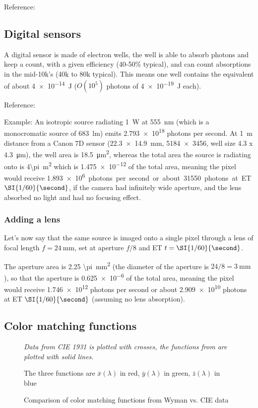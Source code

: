 Reference: 

\subsection{Digital sensors}
A digital sensor is made of electron wells, the well is able to absorb photons
and keep a count, with a given efficiency (40-50\% typical), and can count
absorptions in the mid-10k’s (40k to 80k typical).
This means one well contains the equivalent of about \SI{4e-14}{\joule}
($O(10^5)$ photons of \SI{4e-19}{\joule} each).

Reference: 

Example:
An isotropic source radiating \SI{1}{\watt} at \SI{555}{\nano\meter}
(which is a monocromatic source of \SI{683}{\lumen}) emits \num{2.793e18} photons per second.
At \SI{1}{\meter} distance from a Canon 7D sensor
(\SI{22.3 x 14.9}{\milli\meter}, \SI{5184 x 3456}{\pixel}, well size \SI{4.3 x
4.3}{\micro\meter}),
the well area is \SI{18.5}{\square\micro\meter}, whereas the total area the
source is radiating onto
is \SI{4\pi}{\square\meter} which is \num{1.475e-12} of the total area, meaning
the pixel would
receive \SI{1.893e6} photons per second or about \num{31550} photons at ET
$\SI{1/60}{\second}$, if the
camera had infinitely wide aperture, and the lens absorbed no light and had
no focusing effect.

\subsubsection{Adding a lens}
Let's now say that the same source is imaged onto a single pixel through a lens
of
focal length $f = \SI{24}{\milli\meter}$, set at aperture $f/8$ and ET $t = \SI{1/60}{\second}$.

The aperture area is \SI{2.25 \pi}{\square\milli\meter} (the diameter of the
aperture is
$24/8 = \SI{3}{\milli\meter}$), so that the aperture is \num{0.625e-6} of the
total area, meaning
the pixel would receive \num{1.746e12} photons per second or about
\num{2.909e10} photons
at ET $\SI{1/60}{\second}$ (assuming no lens absorption).
\fi


\subsection{Color matching functions}

\begin{figure}
{
\centering

\caption{Comparison of color matching functions from Wyman vs. CIE data}
\label{fig:cmf1931wyman}
}
\vskip 1mm
{\footnotesize\it Data from CIE 1931 is plotted with crosses,
the functions from  \cite{wyman13} are plotted with solid lines.

The three functions are $\bar x(\lambda)$ in red, $\bar y(\lambda)$ in green,
$\bar z(\lambda)$ in blue}
\end{figure}

